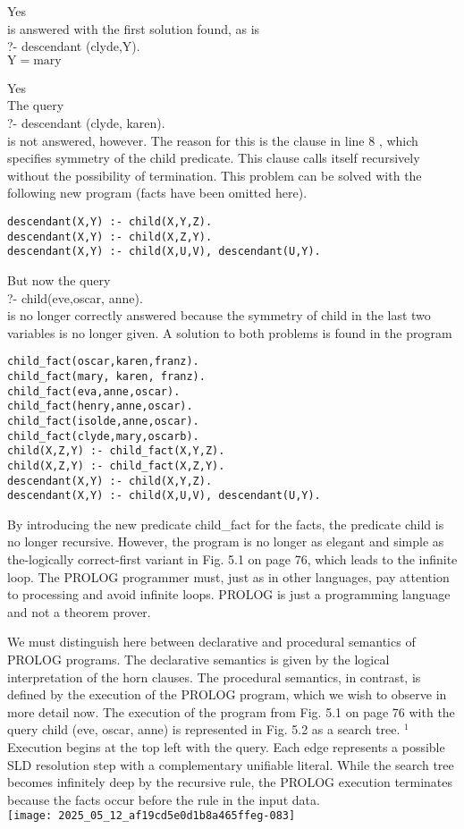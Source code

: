 \documentclass[10pt]{article}
\begin{document}
Yes\\
is answered with the first solution found, as is\\
?- descendant (clyde,Y).\\
$\mathrm{Y}=\mathrm{mar} \mathrm{y}$

Yes\\
The query\\
?- descendant (clyde, karen).\\
is not answered, however. The reason for this is the clause in line 8 , which specifies symmetry of the child predicate. This clause calls itself recursively without the possibility of termination. This problem can be solved with the following new program (facts have been omitted here).

\begin{verbatim}
descendant(X,Y) :- child(X,Y,Z).
descendant(X,Y) :- child(X,Z,Y).
descendant(X,Y) :- child(X,U,V), descendant(U,Y).
\end{verbatim}

But now the query\\
?- child(eve,oscar, anne).\\
is no longer correctly answered because the symmetry of child in the last two variables is no longer given. A solution to both problems is found in the program

\begin{verbatim}
child_fact(oscar,karen,franz).
child_fact(mary, karen, franz).
child_fact(eva,anne,oscar).
child_fact(henry,anne,oscar).
child_fact(isolde,anne,oscar).
child_fact(clyde,mary,oscarb).
child(X,Z,Y) :- child_fact(X,Y,Z).
child(X,Z,Y) :- child_fact(X,Z,Y).
descendant(X,Y) :- child(X,Y,Z).
descendant(X,Y) :- child(X,U,V), descendant(U,Y).
\end{verbatim}

By introducing the new predicate child\_fact for the facts, the predicate child is no longer recursive. However, the program is no longer as elegant and simple as the-logically correct-first variant in Fig. 5.1 on page 76, which leads to the infinite loop. The PROLOG programmer must, just as in other languages, pay attention to processing and avoid infinite loops. PROLOG is just a programming language and not a theorem prover.

We must distinguish here between declarative and procedural semantics of PROLOG programs. The declarative semantics is given by the logical interpretation of the horn clauses. The procedural semantics, in contrast, is defined by the execution of the PROLOG program, which we wish to observe in more detail now. The execution of the program from Fig. 5.1 on page 76 with the query child (eve, oscar, anne) is represented in Fig. 5.2 as a search tree. ${ }^{1}$ Execution begins at the top left with the query. Each edge represents a possible SLD resolution step with a complementary unifiable literal. While the search tree becomes infinitely deep by the recursive rule, the PROLOG execution terminates because the facts occur before the rule in the input data.\\
\texttt{[image: 2025\_05\_12\_af19cd5e0d1b8a465ffeg-083]}
\end{document}
